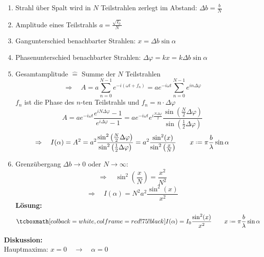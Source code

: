 \begin{enumerate}[(1)]
	\item Strahl über Spalt wird in $ N $ Teilstrahlen zerlegt im Abstand: $ \Delta b = \frac{b}{N} $
	\item Amplitude eines Teilstrahls $ a = \frac{\sqrt{I_0}}{N} $
	\item Gangunterschied benachbarter Strahlen: $ x = \Delta b \sin \alpha $
	\item Phasenunterschied benachbarter Strahlen: $ \Delta \varphi = k x = k \Delta b \sin \alpha  $
	\item Gesamtamplitude $ \widehat{=} $ Summe der $ N $ Teilstrahlen
	\begin{equation*}
	\Rightarrow \quad A = a \sum_{n=0}^{N-1} e^{-i(\omega t + f_n)} = a e^{-i \omega t} \sum_{n=0}^{N-1} e^{i n \Delta \varphi}
	\end{equation*}
	$ f_n $ ist die Phase des $ n $-ten Teilstrahls und $ f_n = n \cdot \Delta \varphi $
	\begin{equation*}
	A = a e^{-i\omega t} \frac{e^{i N \Delta \varphi}-1}{e^{i \Delta \varphi}-1} = a e^{- i \omega t} e^{i \frac{N \Delta \varphi}{2}} \frac{\sin\left(\frac{N}{2} \Delta \varphi\right)}{\sin\left(\frac{1}{2} \Delta \varphi\right)}
	\end{equation*}
	\begin{equation*}
	\Rightarrow \quad I(\alpha) = A^2 = a^2 \frac{\sin^2\left(\frac{N}{2} \Delta \varphi \right)}{\sin^2 \left(\frac{1}{2} \Delta \varphi \right)} = a^2 \frac{\sin^2 (x)}{\sin^2 \left(\frac{x}{N}\right)} \qquad x \defeq \pi \frac{b}{\lambda} \sin \alpha
	\end{equation*}
	\item Grenzübergang $ \Delta b \rightarrow 0 $ oder $ N \rightarrow \infty $:
	\begin{equation*}
	\Rightarrow \quad \sin^2\left(\frac{x}{N}\right) = \frac{x^2}{N^2}
	\end{equation*}
	\begin{equation*}
	\Rightarrow \quad I(\alpha)  = N^2 a^2 \frac{\sin^2(x)}{x^2}
	\end{equation*}
	\textbf{Lösung:}
	\begin{equation*}
	\rmbox{I(\alpha) = I_0 \frac{\sin^2(x)}{x^2}} \qquad x \defeq \pi \frac{b}{\lambda} \sin \alpha
	\end{equation*}
\end{enumerate}
\textbf{Diskussion:}\\[5pt]
Hauptmaxima: $ x = 0 \quad \rightarrow \quad \alpha = 0 $\\
